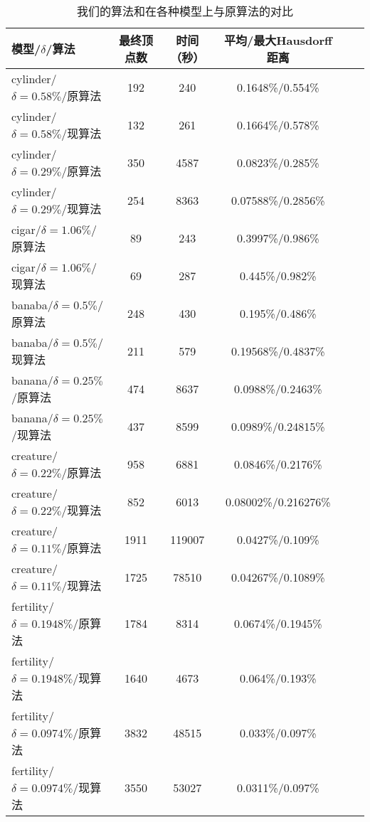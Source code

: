 \begin{table}[htbp]
     \centering
     \caption{我们的算法和在各种模型上与原算法的对比}\label{tab:compare_res}
    \begin{tabu}{lccccc} %
    \toprule
    \textbf{模型/$\delta$/算法} & \textbf{最终顶点数} & \textbf{时间}（秒） & \textbf{平均/最大Hausdorff距离}\\
    \midrule
    cylinder/$\delta=0.58\%$/原算法     & 192  & 240 & 0.1648\%/0.554\%\\
    cylinder/$\delta=0.58\%$/现算法     & 132  & 261 & 0.1664\%/0.578\%\\
    cylinder/$\delta=0.29\%$/原算法     & 350  & 4587 & 0.0823\%/0.285\%\\
    cylinder/$\delta=0.29\%$/现算法     & 254  & 8363 & 0.07588\%/0.2856\%\\
    cigar/$\delta=1.06\%$/原算法        & 89 & 243 & 0.3997\%/0.986\%\\
    cigar/$\delta=1.06\%$/现算法        & 69 & 287 & 0.445\%/0.982\%\\
    banaba/$\delta=0.5\%$/原算法        & 248 & 430 & 0.195\%/0.486\%\\
    banaba/$\delta=0.5\%$/现算法        & 211 & 579 & 0.19568\%/0.4837\%\\
    banana/$\delta=0.25\%$/原算法       & 474 & 8637 & 0.0988\%/0.2463\%\\
    banana/$\delta=0.25\%$/现算法       & 437 & 8599 & 0.0989\%/0.24815\%\\
    creature/$\delta=0.22\%$/原算法     & 958 & 6881 & 0.0846\%/0.2176\%\\
    creature/$\delta=0.22\%$/现算法     & 852 & 6013 & 0.08002\%/0.216276\%\\
    creature/$\delta=0.11\%$/原算法     & 1911 & 119007 & 0.0427\%/0.109\%\\
    creature/$\delta=0.11\%$/现算法     & 1725 & 78510  & 0.04267\%/0.1089\%\\
    fertility/$\delta=0.1948\%$/原算法     & 1784 & 8314 & 0.0674\%/0.1945\%\\
    fertility/$\delta=0.1948\%$/现算法     & 1640 & 4673 & 0.064\%/0.193\%\\
    fertility/$\delta=0.0974\%$/原算法     & 3832 & 48515 & 0.033\%/0.097\%\\
    fertility/$\delta=0.0974\%$/现算法     & 3550 & 53027 & 0.0311\%/0.097\%\\
    \bottomrule
    \end{tabu}%
\end{table}

